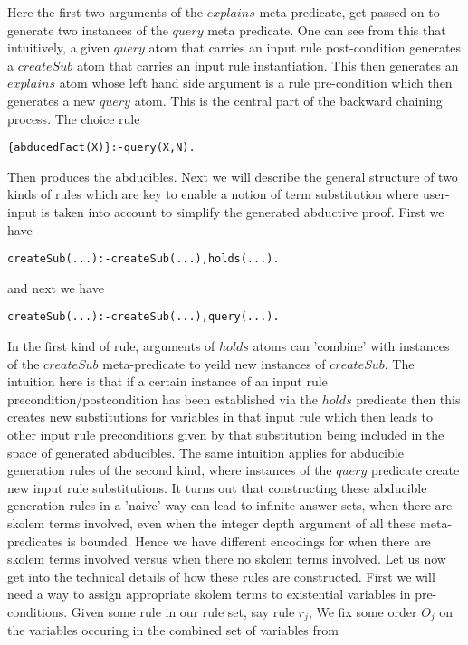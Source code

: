 Here the first two arguments of the $explains$ meta predicate, get passed on to generate two instances of the $query$ meta predicate. One can see from this that intuitively, a given $query$ atom that carries an input rule post-condition generates a $createSub$ atom that carries an input rule instantiation. This then generates an $explains$ atom whose left hand side argument is a rule pre-condition which then generates a new $query$ atom. This is the central part of the backward chaining process. The choice rule
\begin{lstlisting}[frame=none]
{abducedFact(X)}:-query(X,N).
\end{lstlisting}
Then produces the abducibles. Next we will describe the general structure of two kinds of rules which are key to enable a notion of term substitution where user-input is taken into account to simplify the generated abductive proof. First we have 
\begin{lstlisting}[frame=none]
createSub(...):-createSub(...),holds(...).
\end{lstlisting} 
and next we have 
\begin{lstlisting}[frame=none]
createSub(...):-createSub(...),query(...).
\end{lstlisting}
In the first kind of rule, arguments of $holds$ atoms can 'combine' with instances of the $createSub$ meta-predicate to yeild new instances of $createSub$. The intuition here is that if a certain instance of an input rule precondition/postcondition has  been established via the $holds$ predicate then this creates new substitutions for variables in that input rule which then leads to other input rule preconditions given by that substitution being included in the space of generated abducibles. The same intuition applies for abducible generation rules of the second kind, where instances of the $query$ predicate create new input rule substitutions. It turns out that constructing these abducible generation rules in a 'naive' way can lead to infinite answer sets, when there are skolem terms involved, even when the integer depth argument of all these meta-predicates is bounded. Hence we have different encodings for when there are skolem terms involved versus when there no skolem terms involved. Let us now get into the technical details of how these rules are constructed. First we will need a way to assign appropriate skolem terms to existential variables in pre-conditions. Given some rule in our rule set, say rule $r_{j}$, We fix some order
$O_{{j}}$ on the variables occuring in the combined set of variables from
